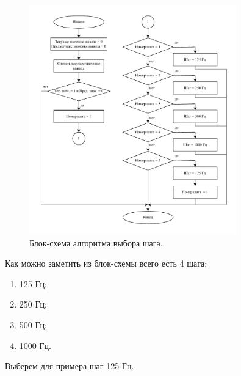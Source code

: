 	\begin{figure}[H]
    \centering
    \includegraphics[width=0.8\textwidth]{../image/step_select.pdf}
    \caption{Блок-схема алгоритма выбора шага.}
	\end{figure}	
	
	Как можно заметить из блок-схемы всего есть 4 шага:
	\begin{enumerate}
		\item 125 Гц;
		\item 250 Гц;
		\item 500 Гц;
		\item 1000 Гц.
	\end{enumerate}
	
	Выберем для примера шаг 125 Гц.
	
